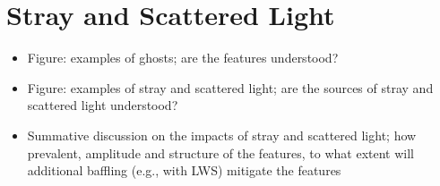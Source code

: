 \section{Stray and Scattered Light}
\label{sec:stray_light}

\begin{itemize}
    \item Figure: examples of ghosts; are the features understood?
    \item Figure: examples of stray and scattered light; are the sources of stray and scattered light understood?
    \item Summative discussion on the impacts of stray and scattered light; how prevalent, amplitude and structure of the features, to what extent will additional baffling (e.g., with LWS) mitigate the features
\end{itemize}